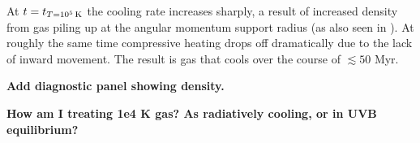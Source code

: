 \documentclass[fleqn,usenatbib]{mnras}
\newcommand{\tcon}{t_{T=10^5\,{\rm K}}}
\newcommand{\Mdot}{\dot{M}}
\newcommand{\nH}{n_{\rm H}}
\begin{document}
At $t=\tcon$ the cooling rate increases sharply, a result of increased density from gas piling up at the angular momentum support radius (as also seen in \citealt{Trapp2021}).
At roughly the same time compressive heating drops off dramatically due to the lack of inward movement.
The result is gas that cools over the course of $\lesssim 50$ Myr.

\textbf{
Add diagnostic panel showing density.
}

\textbf{
How am I treating 1e4 K gas?
As radiatively cooling, or in UVB equilibrium?
}

\end{document}
